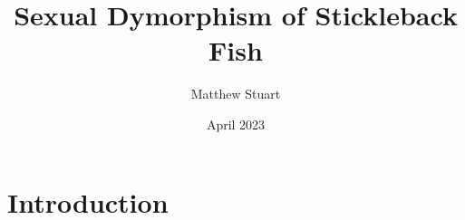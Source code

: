 \documentclass{article}
\title{Sexual Dymorphism of Stickleback Fish}
\author{Matthew Stuart}
\date{April 2023}
\begin{document}
\maketitle

\section{Introduction}
\end{document}
